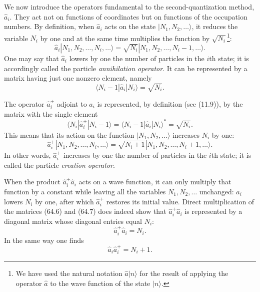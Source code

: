 We now introduce the operators fundamental to the second-quantization method,
$\hat a_i$. They act not on functions of coordinates but on functions of the
occupation numbers. By definition, when $\hat a_i$ acts on the state
$|N_1,N_2,\ldots\rangle$, it reduces the variable $N_i$ by one and at the same
time multiplies the function by $\sqrt{N_i}$\footnote{We have used the natural
notation $\hat a|n\rangle$ for the result of applying the operator $\hat a$ to
the wave function of the state $|n\rangle$.}:
\begin{equation}
 \hat a_i|N_1,N_2,\ldots,N_i,\ldots\rangle
 =\sqrt{N_i}|N_1,N_2,\ldots,N_i-1,\ldots\rangle.
 \tag{64.5}
\end{equation}
One may say that $\hat a_i$ lowers by one the number of particles in the
$i$th state; it is accordingly called the particle \emph{annihilation
operator}. It can be represented by a matrix having just one nonzero element,
namely
\begin{equation}
 \langle N_i-1|\hat a_i|N_i\rangle=\sqrt{N_i}.
 \tag{64.6}
\end{equation}

The operator $\hat a_i^+$ adjoint to $\hat a_i$ is represented, by definition
(see (11.9)), by the matrix with the single element
\begin{equation}
 \langle N_i|\hat a_i^+|N_i-1\rangle
 =\langle N_i-1|\hat a_i|N_i\rangle^*=\sqrt{N_i}.
 \tag{64.7}
\end{equation}
This means that its action on the function $|N_1,N_2,\ldots\rangle$ increases
$N_i$ by one:
\begin{equation}
 \hat a_i^+|N_1,N_2,\ldots,N_i,\ldots\rangle
 =\sqrt{N_i+1}|N_1,N_2,\ldots,N_i+1,\ldots\rangle.
 \tag{64.8}
\end{equation}
In other words, $\hat a_i^+$ increases by one the number of particles in the
$i$th state; it is called the particle \emph{creation operator}.

When the product $\hat a_i^+\hat a_i$ acts on a wave function, it can only
multiply that function by a constant while leaving all the variables
$N_1,N_2,\ldots$ unchanged: $\hat a_i$ lowers $N_i$ by one, after which
$\hat a_i^+$ restores its initial value. Direct multiplication of the matrices
(64.6) and (64.7) does indeed show that $\hat a_i^+\hat a_i$ is represented
by a diagonal matrix whose diagonal entries equal $N_i$:
\begin{equation}
 \hat a_i^+\hat a_i=N_i.
 \tag{64.9}
\end{equation}
In the same way one finds
\begin{equation}
 \hat a_i\hat a_i^+=N_i+1.
 \tag{64.10}
\end{equation}

